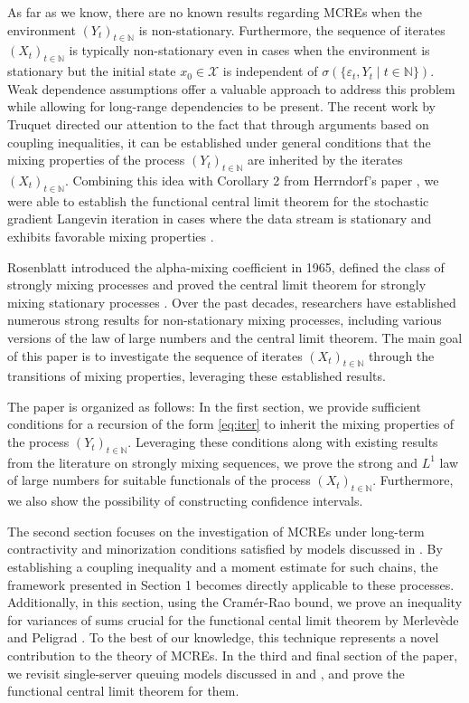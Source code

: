 \documentclass[a4paper,10pt]{article}
\newcommand{\N}{\mathbb{N}}
\newcommand{\X}{\mathcal{X}}
\newcommand{\eps}{\varepsilon}
\begin{document}
As far as we know, there are no known results regarding MCREs when the environment $(Y_t)_{t\in\N}$ is non-stationary. Furthermore, the sequence of iterates $(X_t)_{t\in\N}$ is typically non-stationary even in cases when the environment is stationary but the initial state $x_0\in\X$ is independent of $\sigma (\{\eps_t, Y_t\mid t\in\N\})$. Weak dependence assumptions offer a valuable approach to address this problem while allowing for long-range dependencies to be present. The recent work by Truquet \cite{TRUQUET2023294} directed our attention to the fact that through arguments based on coupling inequalities, it can be established under general conditions that the mixing properties of the process $(Y_t)_{t\in\N}$ are inherited by the iterates $(X_t)_{t\in\N}$. 
Combining this idea with Corollary 2 from Herrndorf's paper \cite{herrndorf1984}, we were able to establish the functional central limit theorem for the stochastic gradient Langevin iteration in cases where the data stream is stationary and exhibits favorable mixing properties \cite{lovasCLT}.

\smallskip
Rosenblatt introduced the alpha-mixing coefficient in 1965, defined the class of strongly mixing processes and proved the central limit theorem for strongly mixing stationary processes \cite{rosenblatt1956central}. Over the past decades, researchers have established numerous strong results for non-stationary mixing processes, including various versions of the law of large numbers and the central limit theorem. The main goal of this paper is to investigate the sequence of iterates $(X_t)_{t\in\N}$ through the transitions of mixing properties, leveraging these established results.

The paper is organized as follows: In the first section, we provide sufficient conditions for a recursion of the form \eqref{eq:iter} to inherit the mixing properties of the process $(Y_t)_{t\in\N}$. Leveraging these conditions along with existing results from the literature on strongly mixing sequences, we prove the strong and $L^1$ law of large numbers for suitable functionals of the process $(X_t)_{t\in\N}$. Furthermore, we also show the possibility of constructing confidence intervals.

The second section focuses on the investigation of MCREs under long-term contractivity and minorization conditions satisfied by models discussed in \cite{lovas}. By establishing a coupling inequality and a moment estimate for such chains, the framework presented in Section 1 becomes directly applicable to these processes. Additionally, in this section, using the Cramér-Rao bound, we prove an inequality for variances of sums crucial for the functional cental limit theorem by Merlev{\`e}de and Peligrad \cite{merlevede2020functional}. To the best of our knowledge, this technique represents a novel contribution to the theory of MCREs.
In the third and final section of the paper, we revisit single-server queuing models discussed in \cite{lovas} and \cite{lovas2021ergodic}, and prove the functional central limit theorem for them. 
\end{document}

